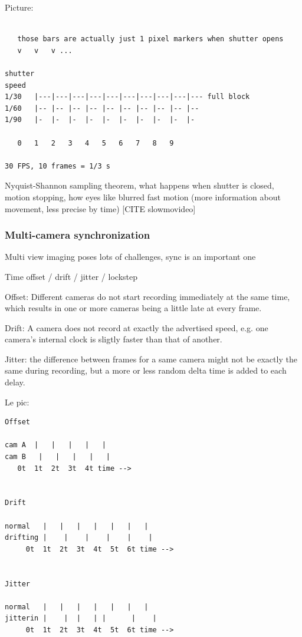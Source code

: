 Picture:

\begin{verbatim}

   those bars are actually just 1 pixel markers when shutter opens
   v   v   v ...

shutter
speed
1/30   |---|---|---|---|---|---|---|---|---|--- full block
1/60   |-- |-- |-- |-- |-- |-- |-- |-- |-- |--
1/90   |-  |-  |-  |-  |-  |-  |-  |-  |-  |-

   0   1   2   3   4   5   6   7   8   9

30 FPS, 10 frames = 1/3 s
\end{verbatim}

Nyquist-Shannon sampling theorem, what happens when shutter is closed, motion stopping, how eyes like blurred fast motion (more information about movement, less precise by time) [CITE slowmovideo]

\subsubsection{Multi-camera synchronization}

Multi view imaging poses lots of challenges, sync is an important one

Time offset / drift / jitter / lockstep

Offset: Different cameras do not start recording immediately at the same time, which results in one or more cameras being a little late at every frame.

Drift: A camera does not record at exactly the advertised speed, e.g. one camera's internal clock is sligtly faster than that of another.

Jitter: the difference between frames for a same camera might not be exactly the same during recording, but a more or less random delta time is added to each delay.

Le pic:

\begin{verbatim}
Offset

cam A  |   |   |   |   |
cam B   |   |   |   |   |
   0t  1t  2t  3t  4t time -->


Drift

normal   |   |   |   |   |   |   |
drifting |    |    |    |    |    |
	 0t  1t  2t  3t  4t  5t  6t time -->


Jitter

normal   |   |   |   |   |   |   |
jitterin |    |  |   | |      |    |
	 0t  1t  2t  3t  4t  5t  6t time -->
\end{verbatim}

